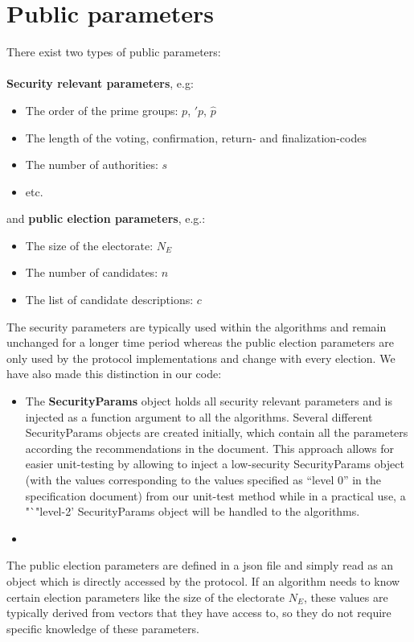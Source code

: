 \documentclass[a4paper,12pt]{report}
\theoremstyle{definition}
\begin{document}
\section{Public parameters}
There exist two types of public parameters: \\\\
\textbf{Security relevant parameters}, e.g:
\begin{itemize}
	\item The order of the prime groups: $p$, $\prime{p}$, $\hat{p}$
	\item The length of the voting, confirmation, return- and finalization-codes
	\item The number of authorities: $s$
	\item etc.
\end{itemize}
and \textbf{public election parameters}, e.g.:
\begin{itemize}
	\item The size of the electorate: $N_E$
	\item The number of candidates: $n$
	\item The list of candidate descriptions: $c$
\end{itemize}
The security parameters are typically used within the algorithms and remain unchanged for a longer time period whereas the public election parameters are only used by the protocol implementations and change with every election. We have also made this distinction in our code:
\begin{itemize}
	\item The \textbf{SecurityParams} object holds all security relevant parameters and is injected as a function argument to all the algorithms. Several different SecurityParams objects are created initially, which contain all the parameters according the recommendations in the document. This approach allows for easier unit-testing by allowing to inject a low-security SecurityParams object (with the values corresponding to the values specified as "`level 0"' in the specification document) from our unit-test method while in a practical use, a "`"level-2' SecurityParams object will be handled to the algorithms.
	\item 
\end{itemize} The public election parameters are defined in a json file and simply read as an object which is directly accessed by the protocol. If an algorithm needs to know certain election parameters like the size of the electorate $N_E$, these values are typically derived from vectors that they have access to, so they do not require specific knowledge of these parameters.
\end{document}
